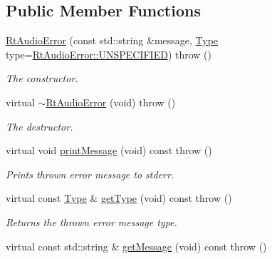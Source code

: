 \subsection*{Public Member Functions}
\begin{DoxyCompactItemize}
\item 
\hyperlink{class_rt_audio_error_a35a8c66eacf2929631cc64b4d80cac2e}{Rt\+Audio\+Error} (const std\+::string \&message, \hyperlink{class_rt_audio_error_a85bdee746d5ba80d655ac98ded21d073}{Type} type=\hyperlink{class_rt_audio_error_a85bdee746d5ba80d655ac98ded21d073a395c8f5ff5e196c148308afa1b17b573}{Rt\+Audio\+Error\+::\+U\+N\+S\+P\+E\+C\+I\+F\+I\+ED})  throw ()\hypertarget{class_rt_audio_error_a35a8c66eacf2929631cc64b4d80cac2e}{}\label{class_rt_audio_error_a35a8c66eacf2929631cc64b4d80cac2e}

\begin{DoxyCompactList}\small\item\em The constructor. \end{DoxyCompactList}\item 
virtual \hyperlink{class_rt_audio_error_af2ea5c2851f6bb5abe3ac3e1c33a5a70}{$\sim$\+Rt\+Audio\+Error} (void)  throw ()\hypertarget{class_rt_audio_error_af2ea5c2851f6bb5abe3ac3e1c33a5a70}{}\label{class_rt_audio_error_af2ea5c2851f6bb5abe3ac3e1c33a5a70}

\begin{DoxyCompactList}\small\item\em The destructor. \end{DoxyCompactList}\item 
virtual void \hyperlink{class_rt_audio_error_a0124bb90075cf3201865a0ea9b43a826}{print\+Message} (void) const   throw ()\hypertarget{class_rt_audio_error_a0124bb90075cf3201865a0ea9b43a826}{}\label{class_rt_audio_error_a0124bb90075cf3201865a0ea9b43a826}

\begin{DoxyCompactList}\small\item\em Prints thrown error message to stderr. \end{DoxyCompactList}\item 
virtual const \hyperlink{class_rt_audio_error_a85bdee746d5ba80d655ac98ded21d073}{Type} \& \hyperlink{class_rt_audio_error_a09d238f227d41990773e1142fc06b144}{get\+Type} (void) const   throw ()\hypertarget{class_rt_audio_error_a09d238f227d41990773e1142fc06b144}{}\label{class_rt_audio_error_a09d238f227d41990773e1142fc06b144}

\begin{DoxyCompactList}\small\item\em Returns the thrown error message type. \end{DoxyCompactList}\item 
virtual const std\+::string \& \hyperlink{class_rt_audio_error_af1e84bd3ebc86210a723d1839b4f9cbf}{get\+Message} (void) const   throw ()\hypertarget{class_rt_audio_error_af1e84bd3ebc86210a723d1839b4f9cbf}{}\label{class_rt_audio_error_af1e84bd3ebc86210a723d1839b4f9cbf}


\end{DoxyCompactItemize}
